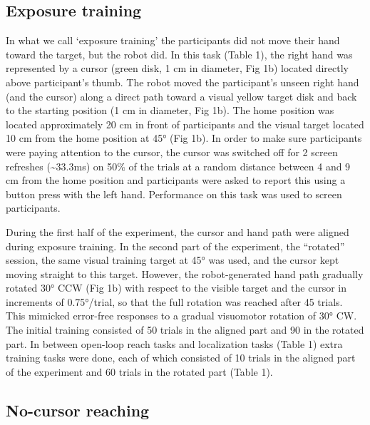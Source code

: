 \documentclass[10pt,letterpaper]{article}
\begin{document}
\subsection{Exposure training}\label{exposure-training}

In what we call `exposure training' the participants did not move their
hand toward the target, but the robot did. In this task (Table 1), the
right hand was represented by a cursor (green disk, 1 cm in diameter,
Fig 1b) located directly above participant's thumb. The robot moved the
participant's unseen right hand (and the cursor) along a direct path
toward a visual yellow target disk and back to the starting position (1
cm in diameter, Fig 1b). The home position was located approximately 20
cm in front of participants and the visual target located 10 cm from the
home position at 45° (Fig 1b). In order to make sure participants were
paying attention to the cursor, the cursor was switched off for 2 screen
refreshes (\textasciitilde{}33.3ms) on 50\% of the trials at a random
distance between 4 and 9 cm from the home position and participants were
asked to report this using a button press with the left hand.
Performance on this task was used to screen participants.

During the first half of the experiment, the cursor and hand path were
aligned during exposure training. In the second part of the experiment,
the ``rotated'' session, the same visual training target at 45° was
used, and the cursor kept moving straight to this target. However, the
robot-generated hand path gradually rotated 30° CCW (Fig 1b) with
respect to the visible target and the cursor in increments of
0.75°/trial, so that the full rotation was reached after 45 trials. This
mimicked error-free responses to a gradual visuomotor rotation of 30°
CW. The initial training consisted of 50 trials in the aligned part and
90 in the rotated part. In between open-loop reach tasks and
localization tasks (Table 1) extra training tasks were done, each of
which consisted of 10 trials in the aligned part of the experiment and
60 trials in the rotated part (Table 1).

\subsection{No-cursor reaching}\label{no-cursor-reaching}
\end{document}
